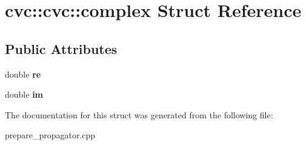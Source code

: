 \hypertarget{structcvc_1_1cvc_1_1complex}{\section{cvc\-:\-:cvc\-:\-:complex Struct Reference}
\label{structcvc_1_1cvc_1_1complex}
}
\subsection*{Public Attributes}
\begin{DoxyCompactItemize}
\item 
\hypertarget{structcvc_1_1cvc_1_1complex_aa186aa5552e78ba59835f2fefdbcc4f6}{double {\bfseries re}}\label{structcvc_1_1cvc_1_1complex_aa186aa5552e78ba59835f2fefdbcc4f6}

\item 
\hypertarget{structcvc_1_1cvc_1_1complex_a14a974e4feefa0b3b3b71f68a6b757da}{double {\bfseries im}}\label{structcvc_1_1cvc_1_1complex_a14a974e4feefa0b3b3b71f68a6b757da}

\end{DoxyCompactItemize}


The documentation for this struct was generated from the following file\-:\begin{DoxyCompactItemize}
\item 
prepare\-\_\-propagator.\-cpp\end{DoxyCompactItemize}
